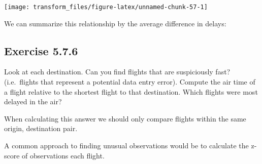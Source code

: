 \documentclass[]{book}
\newenvironment{Shaded}{\begin{snugshade}}{\end{snugshade}}
\newcommand{\CommentTok}[1]{\textcolor[rgb]{0.56,0.35,0.01}{\textit{#1}}}
\newcommand{\DataTypeTok}[1]{\textcolor[rgb]{0.13,0.29,0.53}{#1}}
\newcommand{\KeywordTok}[1]{\textcolor[rgb]{0.13,0.29,0.53}{\textbf{#1}}}
\newcommand{\NormalTok}[1]{#1}
\newcommand{\OperatorTok}[1]{\textcolor[rgb]{0.81,0.36,0.00}{\textbf{#1}}}
\newcommand{\OtherTok}[1]{\textcolor[rgb]{0.56,0.35,0.01}{#1}}
\newcommand{\StringTok}[1]{\textcolor[rgb]{0.31,0.60,0.02}{#1}}
\theoremstyle{plain}
\theoremstyle{remark}
\theoremstyle{definition}
\theoremstyle{definition}
\theoremstyle{definition}
\theoremstyle{remark}
\begin{document}
\begin{center}\texttt{[image: transform\_files/figure-latex/unnamed-chunk-57-1]} \end{center}

We can summarize this relationship by the average difference in delays:

\begin{Shaded}
\end{Shaded}

\hypertarget{exercise-5.7.6}{%
\subsection*{\texorpdfstring{Exercise
{5.7.6}}{Exercise 5.7.6}}\label{exercise-5.7.6}}

Look at each destination. Can you find flights that are suspiciously
fast? (i.e.~flights that represent a potential data entry error).
Compute the air time of a flight relative to the shortest flight to that
destination. Which flights were most delayed in the air?

When calculating this answer we should only compare flights within the
same origin, destination pair.

A common approach to finding unusual observations would be to calculate
the z-score of observations each flight.

\begin{Shaded}
\end{Shaded}
\end{document}
